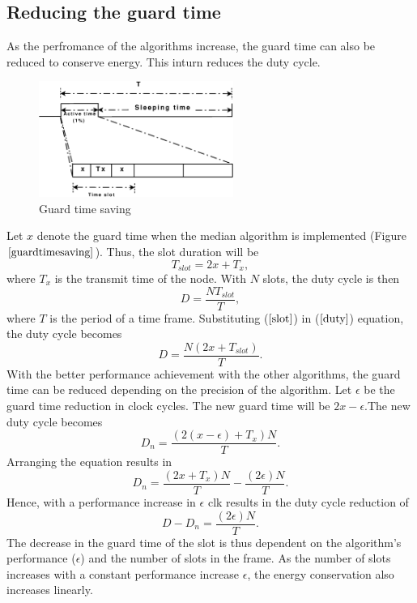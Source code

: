 \documentclass[journal]{IEEEtran}
\begin{document}
\subsection{\textbf{Reducing the guard time}}
As the perfromance of the algorithms increase, the guard time can also be reduced to conserve energy. This inturn
reduces the duty cycle.
\begin{figure}[b]
\centering
\includegraphics[width=2.5in]{guardtimesaving}
\caption{Guard time saving} \label{guardtimesaving}
\end{figure}
\newline Let $x$ denote the guard time when the median algorithm is
implemented (Figure $\ref{guardtimesaving}$). Thus, the slot
duration will be
\begin{equation}
T_{slot}=2x + T_x ,
\label{slot}
\end{equation}
where $T_x$ is the transmit time of the node. \newline
With $N$ slots, the duty cycle is then
\begin{equation}
D = \frac{NT_{slot}}{T}, \label{duty}
\end{equation}
where $T$ is the period of a time frame. \newline Substituting
($\ref{slot}$) in ($\ref{duty}$) equation, the duty cycle becomes
\begin{equation}
D= \frac{N(2x+T_{slot})}{T}.
\end{equation}
With the better performance achievement with the other algorithms,
the guard time can be reduced depending on the precision of the
algorithm. Let $\epsilon$ be the guard time reduction in clock
cycles. The new guard time will be $2x-\epsilon$.\newline The
new duty cycle becomes
\begin{equation}
D_n=\frac{(2(x-\epsilon)+T_x)N}{T}.
\end{equation}
Arranging the equation results in
\begin{equation}
D_n= \frac{(2x+T_x)N}{T} - \frac{(2\epsilon)N}{T}.
\end{equation}
Hence, with a performance increase in $\epsilon$ clk results in the
duty cycle reduction of
\begin{equation}
D - D_n = \frac{(2\epsilon)N}{T}.
\end{equation}
The decrease in the guard time of the slot is thus dependent on the
algorithm's performance ($\epsilon$) and the number of slots in the
frame. As the number of slots increases with a constant performance increase $\epsilon$, the energy conservation
also increases linearly.
\end{document}
